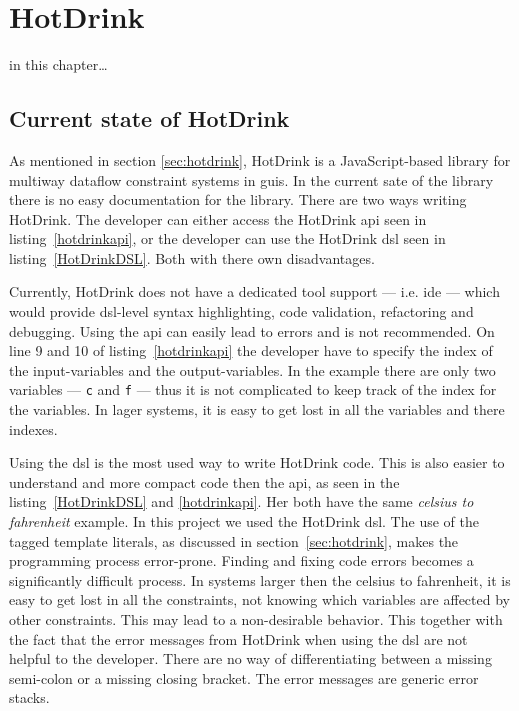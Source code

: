 \chapter{HotDrink} 
in this chapter…

\section{Current state of HotDrink}
\label{sec:currentstate}

As mentioned in section \ref{sec:hotdrink}, HotDrink is a JavaScript-based library for
multiway dataflow constraint systems in \gls{gui}s. In the current sate of the library 
there is no easy documentation for the library. There are two ways writing HotDrink. 
The developer can either access the HotDrink \gls{api} seen in listing~\ref{hotdrinkapi}, 
or the developer can use the HotDrink \gls{dsl} seen in listing~\ref{HotDrinkDSL}. Both 
with there own disadvantages. 

Currently, HotDrink does not have a dedicated tool support --- i.e. \gls{ide} --- which 
would provide \gls{dsl}-level syntax highlighting, code validation, refactoring and 
debugging. Using the \gls{api} can easily lead to errors and is not recommended. On line 9 and 10 
of listing~\ref{hotdrinkapi} the developer have to specify the index of the 
input-variables and the output-variables. In the example there are only two variables 
--- \texttt{c} and \texttt{f} --- thus it is not complicated to keep track of the index 
for the variables. In lager systems, it is easy to get lost in all the variables and 
there indexes.

Using the \gls{dsl} is the most used way to write HotDrink code. This is also easier to 
understand and more compact code then the \gls{api}, as seen in the listing~\ref{HotDrinkDSL} 
and \ref{hotdrinkapi}. Her both have the same \textit{celsius to fahrenheit} example. In 
this project we used the HotDrink \gls{dsl}. The use of the tagged template literals, as 
discussed in section~\ref{sec:hotdrink}, makes the programming process error-prone. 
Finding and fixing code errors becomes a significantly difficult process. In systems 
larger then the celsius to fahrenheit, it is easy to get lost in all the constraints, 
not knowing which variables are affected by other constraints. This may lead to a 
non-desirable behavior.
This together with the fact that the error messages from HotDrink when using 
the \gls{dsl} are not helpful to the developer. There are no way of differentiating 
between a missing semi-colon or a missing closing bracket. The error messages are 
generic error stacks. 

